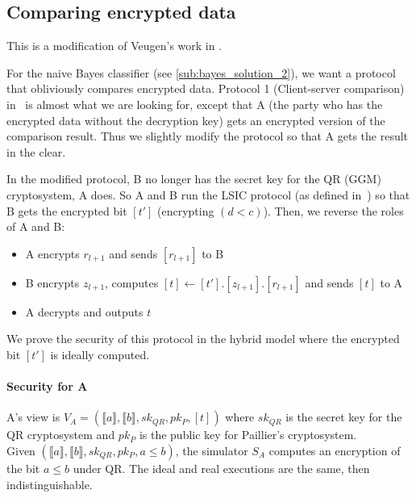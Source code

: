 \documentclass[11pt]{article}
\newcommand{\llb}{\llbracket}
\newcommand{\rrb}{\rrbracket}
\begin{document}

\subsection{Comparing encrypted data} %
\label{sub:comparing_encrypted_data}
	This is a modification of Veugen's work in \cite{Veugen}. 
	
	For the naive Bayes classifier (see \ref{sub:bayes_solution_2}), we want a protocol that obliviously compares encrypted data. Protocol 1 (Client-server comparison) in~\cite{Veugen} is almost what we are looking for, except that A (the party who has the encrypted data without the decryption key) gets an encrypted version of the comparison result. Thus we slightly modify the protocol so that A gets the result in the clear.
	
	In the modified protocol, B no longer has the secret key for the QR (GGM) cryptosystem, A does. So A and B run the LSIC protocol (as defined in~\cite{Veugen}) so that B gets the encrypted bit $[t']$ (encrypting $(d < c)$). Then, we reverse the roles of A and B: 
	\begin{itemize}
		\item A encrypts $r_{l+1}$ and sends $[r_{l+1}]$ to B
		\item B encrypts $z_{l+1}$, computes $[t] \leftarrow [t'].[z_{l+1}].[r_{l+1}]$ and sends $[t]$ to A
		\item A decrypts and outputs $t$
	\end{itemize}
	
	We prove the security of this protocol in the hybrid model where the encrypted bit $[t']$ is ideally computed.
	
	\paragraph{Security for A} A's view is $V_A = (\llb a\rrb,\llb b\rrb,sk_{QR},pk_P,[t])$ where $sk_{QR}$ is the secret key for the QR cryptosystem and $pk_P$ is the public key for Paillier's cryptosystem.\\
	Given $(\llb a\rrb,\llb b\rrb,sk_{QR},pk_P, a \leq b)$, the simulator $S_A$ computes an encryption of the bit $a \leq b$ under QR. The ideal and real executions are the same, then indistinguishable.
	
\end{document}
